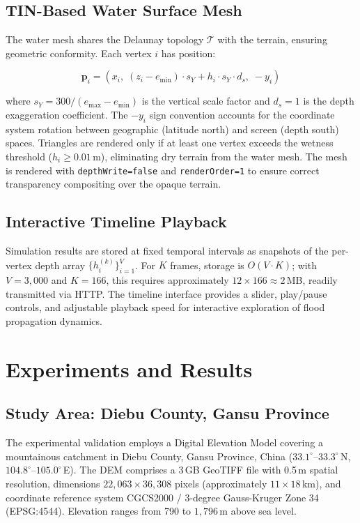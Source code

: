 \documentclass[11pt, a4paper]{article}
\newcommand{\vect}[1]{\boldsymbol{#1}}
\begin{document}
\subsection{TIN-Based Water Surface Mesh}

The water mesh shares the Delaunay topology $\mathcal{T}$ with the terrain, ensuring geometric conformity. Each vertex $i$ has position:

\begin{equation}
  \vect{p}_i = \left(x_i, \; (z_i - e_{\min}) \cdot s_Y + h_i \cdot s_Y \cdot d_s, \; -y_i\right)
  \label{eq:water_vert}
\end{equation}

\noindent where $s_Y = 300 / (e_{\max} - e_{\min})$ is the vertical scale factor and $d_s = 1$ is the depth exaggeration coefficient. The $-y_i$ sign convention accounts for the coordinate system rotation between geographic (latitude north) and screen (depth south) spaces. Triangles are rendered only if at least one vertex exceeds the wetness threshold ($h_i \geq 0.01$\,m), eliminating dry terrain from the water mesh. The mesh is rendered with \texttt{depthWrite=false} and \texttt{renderOrder=1} to ensure correct transparency compositing over the opaque terrain.

\subsection{Interactive Timeline Playback}

Simulation results are stored at fixed temporal intervals as snapshots of the per-vertex depth array $\{h_i^{(k)}\}_{i=1}^{V}$. For $K$ frames, storage is $O(V \cdot K)$; with $V = 3{,}000$ and $K = 166$, this requires approximately $12 \times 166 \approx 2$\,MB, readily transmitted via HTTP. The timeline interface provides a slider, play/pause controls, and adjustable playback speed for interactive exploration of flood propagation dynamics.

\section{Experiments and Results}
\label{sec:exp}

\subsection{Study Area: Diebu County, Gansu Province}

The experimental validation employs a Digital Elevation Model covering a mountainous catchment in Diebu County, Gansu Province, China ($33.1^\circ$--$33.3^\circ$\,N, $104.8^\circ$--$105.0^\circ$\,E). The DEM comprises a 3\,GB GeoTIFF file with 0.5\,m spatial resolution, dimensions $22{,}063 \times 36{,}308$ pixels (approximately $11 \times 18$\,km), and coordinate reference system CGCS2000 / 3-degree Gauss-Kruger Zone 34 (EPSG:4544). Elevation ranges from 790 to $1{,}796$\,m above sea level.
\end{document}
